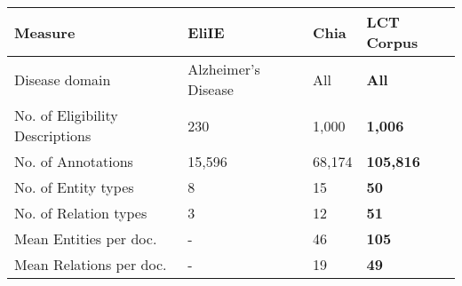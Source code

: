 \begin{tabular}{l|lll} 
 \toprule
 Measure & EliIE \cite{kang2017eliie} & Chia \cite{kury2020chia} & \textbf{LCT Corpus} \\
 \hline
    Disease domain & Alzheimer's Disease & All & \textbf{All} \\
    No. of Eligibility Descriptions & 230 & 1,000 & \textbf{1,006} \\
    No. of Annotations & 15,596 & 68,174 & \textbf{105,816} \\
    No. of Entity types & 8 & 15 & \textbf{50} \\
    No. of Relation types & 3 & 12 & \textbf{51} \\
    Mean Entities per doc. & - & 46 & \textbf{105} \\
    Mean Relations per doc. & - & 19 & \textbf{49} \\
 \hline
\end{tabular}